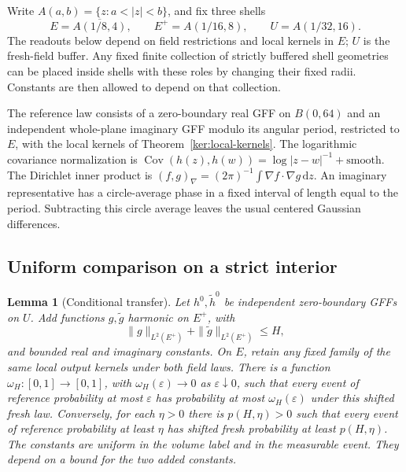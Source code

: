 \documentclass[11pt]{article}
\numberwithin{equation}{section}
\newtheorem{lemma}[theorem]{Lemma}
\theoremstyle{definition}
\theoremstyle{remark}
\newcommand{\dd}{\mathrm d}
\newcommand{\1}{\mathbf 1}
\DeclareMathOperator{\Cov}{Cov}
\begin{document}
Write \(A(a,b)=\{z:a<|z|<b\}\), and fix three shells
\begin{equation}
 E=\overline{A(1/8,4)},\qquad E^+=A(1/16,8),\qquad
 U=A(1/32,16).
 \label{ann:shells}
\end{equation}
The readouts below depend on field restrictions and local kernels in
\(E\); \(U\) is the fresh-field buffer.  Any fixed finite collection of
strictly buffered shell geometries can be placed inside shells with
these roles by changing their fixed radii.  Constants are then allowed
to depend on that collection.

The reference law consists of a zero-boundary real GFF on \(B(0,64)\)
and an independent whole-plane imaginary GFF modulo its angular
period, restricted to \(E\), with the local kernels of
Theorem~\ref{ker:local-kernels}.  The logarithmic covariance
normalization is
\(\Cov(h(z),h(w))=\log|z-w|^{-1}+\text{smooth}\).
The Dirichlet inner product is
\((f,g)_\nabla=(2\pi)^{-1}\int\nabla f\cdot\nabla g\,\dd z\).
An imaginary representative has a circle-average phase in a fixed
interval of length equal to the period.  Subtracting this circle
average leaves the usual centered Gaussian differences.

\subsection{Uniform comparison on a strict interior}

\begin{lemma}[Conditional transfer]\label{ann:conditional-transfer}
Let \(h^0,\widetilde h^0\) be independent zero-boundary GFFs on \(U\).
Add functions \(g,\widetilde g\) harmonic on \(E^+\), with
\[
 \|g\|_{L^2(E^+)}+\|\widetilde g\|_{L^2(E^+)}\le H,
\]
and bounded real and imaginary constants.  On \(E\), retain any fixed
family of the same local output kernels under both field laws.
There is a function \(\omega_H:[0,1]\to[0,1]\), with
\(\omega_H(\varepsilon)\to0\) as \(\varepsilon\downarrow0\), such that
every event of reference probability at most \(\varepsilon\) has
probability at most \(\omega_H(\varepsilon)\) under this shifted fresh
law.  Conversely, for each \(\eta>0\) there is \(p(H,\eta)>0\)
such that every event of reference probability at least \(\eta\) has
shifted fresh probability at least \(p(H,\eta)\).
The constants are uniform in the volume label and in the measurable
event.  They depend on a bound for the two added constants.
\end{lemma}
\end{document}
